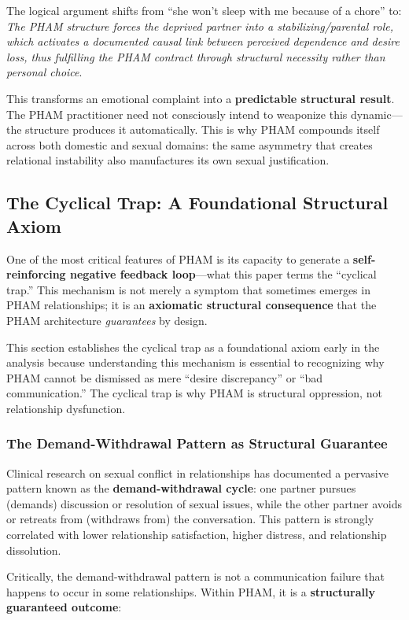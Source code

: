 \documentclass[12pt, letterpaper]{article}
\begin{document}
The logical argument shifts from ``she won't sleep with me because of a chore'' to: \textit{The PHAM structure forces the deprived partner into a stabilizing/parental role, which activates a documented causal link between perceived dependence and desire loss, thus fulfilling the PHAM contract through structural necessity rather than personal choice}.

This transforms an emotional complaint into a \textbf{predictable structural result}. The PHAM practitioner need not consciously intend to weaponize this dynamic---the structure produces it automatically. This is why PHAM compounds itself across both domestic and sexual domains: the same asymmetry that creates relational instability also manufactures its own sexual justification.

\subsection{The Cyclical Trap: A Foundational Structural Axiom}

One of the most critical features of PHAM is its capacity to generate a \textbf{self-reinforcing negative feedback loop}---what this paper terms the ``cyclical trap.'' This mechanism is not merely a symptom that sometimes emerges in PHAM relationships; it is an \textbf{axiomatic structural consequence} that the PHAM architecture \textit{guarantees} by design.

This section establishes the cyclical trap as a foundational axiom early in the analysis because understanding this mechanism is essential to recognizing why PHAM cannot be dismissed as mere ``desire discrepancy'' or ``bad communication.'' The cyclical trap is why PHAM is structural oppression, not relationship dysfunction.

\subsubsection{The Demand-Withdrawal Pattern as Structural Guarantee}

Clinical research on sexual conflict in relationships has documented a pervasive pattern known as the \textbf{demand-withdrawal cycle}: one partner pursues (demands) discussion or resolution of sexual issues, while the other partner avoids or retreats from (withdraws from) the conversation. This pattern is strongly correlated with lower relationship satisfaction, higher distress, and relationship dissolution.

Critically, the demand-withdrawal pattern is not a communication failure that happens to occur in some relationships. Within PHAM, it is a \textbf{structurally guaranteed outcome}:
\end{document}
